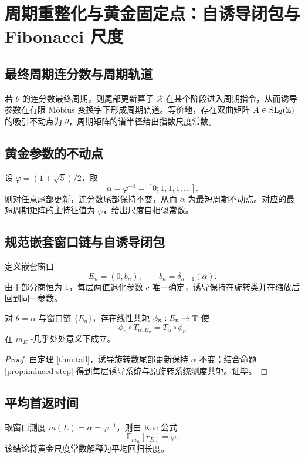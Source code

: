\section{周期重整化与黄金固定点：自诱导闭包与 Fibonacci 尺度}

\subsection{最终周期连分数与周期轨道}

若 $\theta$ 的连分数最终周期，则尾部更新算子 $\mathcal{R}$ 在某个阶段进入周期指令，从而诱导参数在有限 Möbius 变换字下形成周期轨道。等价地，存在双曲矩阵 $A\in \mathrm{SL}_2(\mathbb{Z})$ 的吸引不动点为 $\theta$，周期矩阵的谱半径给出指数尺度常数。

\subsection{黄金参数的不动点}

设 $\varphi=(1+\sqrt 5)/2$，取
\[
\alpha=\varphi^{-1}=[0;1,1,1,\dots].
\]
则对任意尾部更新，连分数尾部保持不变，从而 $\alpha$ 为最短周期不动点。对应的最短周期矩阵的主特征值为 $\varphi$，给出尺度自相似常数。

\subsection{规范嵌套窗口链与自诱导闭包}

定义嵌套窗口
\[
E_n=(0,b_n),\qquad b_n=\delta_{n-1}(\alpha).
\]
由于部分商恒为 $1$，每层两值退化参数 $c$ 唯一确定，诱导保持在旋转类并在缩放后回到同一参数。

\begin{theorem}[黄金自诱导闭包]\label{thm:golden-self-induced}
对 $\theta=\alpha$ 与窗口链 $\{E_n\}$，存在线性共轭 $\phi_n:E_n\to\mathbb{T}$ 使
\[
\phi_n\circ T_{\alpha,E_n}=T_\alpha\circ \phi_n
\]
在 $m_{E_n}$-几乎处处意义下成立。
\end{theorem}

\begin{proof}
由定理 \ref{thm:tail}，诱导旋转数尾部更新保持 $\alpha$ 不变；结合命题 \ref{prop:induced-step} 得到每层诱导系统与原旋转系统测度共轭。证毕。
\end{proof}

\subsection{平均首返时间}

取窗口测度 $m(E)=\alpha=\varphi^{-1}$，则由 Kac 公式
\[
\mathbb{E}_{m_E}[r_E]=\varphi.
\]
该结论将黄金尺度常数解释为平均回归长度。

